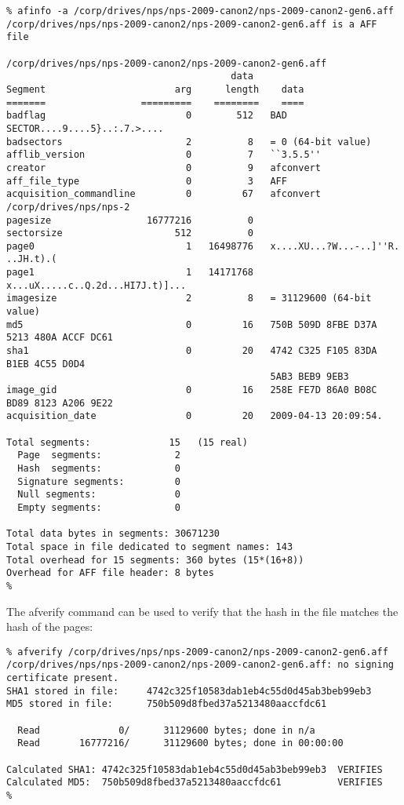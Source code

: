 \documentclass{book}
\begin{document}
\begin{Verbatim}
% afinfo -a /corp/drives/nps/nps-2009-canon2/nps-2009-canon2-gen6.aff
/corp/drives/nps/nps-2009-canon2/nps-2009-canon2-gen6.aff is a AFF file

/corp/drives/nps/nps-2009-canon2/nps-2009-canon2-gen6.aff
                                        data       
Segment                       arg      length    data
=======                 =========    ========    ====
badflag                         0        512   BAD SECTOR....9....5}..:.7.>....
badsectors                      2          8   = 0 (64-bit value)
afflib_version                  0          7   ``3.5.5''
creator                         0          9   afconvert
aff_file_type                   0          3   AFF
acquisition_commandline         0         67   afconvert /corp/drives/nps/nps-2
pagesize                 16777216          0   
sectorsize                    512          0   
page0                           1   16498776   x....XU...?W...-..]''R. ..JH.t).(
page1                           1   14171768   x...uX.....c..Q.2d...HI7J.t)]...
imagesize                       2          8   = 31129600 (64-bit value)
md5                             0         16   750B 509D 8FBE D37A 5213 480A ACCF DC61 
sha1                            0         20   4742 C325 F105 83DA B1EB 4C55 D0D4 
                                               5AB3 BEB9 9EB3 
image_gid                       0         16   258E FE7D 86A0 B08C BD89 8123 A206 9E22 
acquisition_date                0         20   2009-04-13 20:09:54.

Total segments:              15   (15 real)
  Page  segments:             2
  Hash  segments:             0
  Signature segments:         0
  Null segments:              0
  Empty segments:             0

Total data bytes in segments: 30671230
Total space in file dedicated to segment names: 143
Total overhead for 15 segments: 360 bytes (15*(16+8))
Overhead for AFF file header: 8 bytes
%  
\end{Verbatim}

The afverify command can be used to verify that the hash in the file
matches the hash of the pages:

\begin{Verbatim}
% afverify /corp/drives/nps/nps-2009-canon2/nps-2009-canon2-gen6.aff
/corp/drives/nps/nps-2009-canon2/nps-2009-canon2-gen6.aff: no signing certificate present. 
SHA1 stored in file:     4742c325f10583dab1eb4c55d0d45ab3beb99eb3
MD5 stored in file:      750b509d8fbed37a5213480aaccfdc61

  Read              0/      31129600 bytes; done in n/a
  Read       16777216/      31129600 bytes; done in 00:00:00

Calculated SHA1: 4742c325f10583dab1eb4c55d0d45ab3beb99eb3  VERIFIES
Calculated MD5:  750b509d8fbed37a5213480aaccfdc61          VERIFIES
% 
\end{Verbatim}
\end{document}
